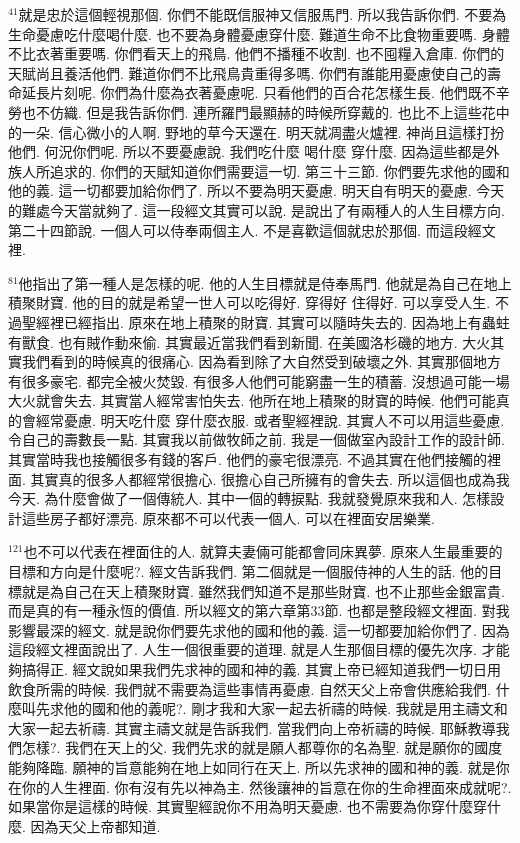 \documentclass{book}
\begin{document}
$^{41}$就是忠於這個輕視那個.
你們不能既信服神又信服馬門.
所以我告訴你們.
不要為生命憂慮吃什麼喝什麼.
也不要為身體憂慮穿什麼.
難道生命不比食物重要嗎.
身體不比衣著重要嗎.
你們看天上的飛鳥.
他們不播種不收割.
也不囤糧入倉庫.
你們的天賦尚且養活他們.
難道你們不比飛鳥貴重得多嗎.
你們有誰能用憂慮使自己的壽命延長片刻呢.
你們為什麼為衣著憂慮呢.
只看他們的百合花怎樣生長.
他們既不辛勞也不仿織.
但是我告訴你們.
連所羅門最顯赫的時候所穿戴的.
也比不上這些花中的一朵.
信心微小的人啊.
野地的草今天還在.
明天就凋盡火爐裡.
神尚且這樣打扮他們.
何況你們呢.
所以不要憂慮說.
我們吃什麼 喝什麼 穿什麼.
因為這些都是外族人所追求的.
你們的天賦知道你們需要這一切.
第三十三節.
你們要先求他的國和他的義.
這一切都要加給你們了.
所以不要為明天憂慮.
明天自有明天的憂慮.
今天的難處今天當就夠了.
這一段經文其實可以說.
是說出了有兩種人的人生目標方向.
第二十四節說.
一個人可以侍奉兩個主人.
不是喜歡這個就忠於那個.
而這段經文裡.

$^{81}$他指出了第一種人是怎樣的呢.
他的人生目標就是侍奉馬門.
他就是為自己在地上積聚財寶.
他的目的就是希望一世人可以吃得好.
穿得好 住得好.
可以享受人生.
不過聖經裡已經指出.
原來在地上積聚的財寶.
其實可以隨時失去的.
因為地上有蟲蛀 有獸食.
也有賊作動來偷.
其實最近當我們看到新聞.
在美國洛杉磯的地方.
大火其實我們看到的時候真的很痛心.
因為看到除了大自然受到破壞之外.
其實那個地方有很多豪宅.
都完全被火焚毀.
有很多人他們可能窮盡一生的積蓄.
沒想過可能一場大火就會失去.
其實當人經常害怕失去.
他所在地上積聚的財寶的時候.
他們可能真的會經常憂慮.
明天吃什麼 穿什麼衣服.
或者聖經裡說.
其實人不可以用這些憂慮.
令自己的壽數長一點.
其實我以前做牧師之前.
我是一個做室內設計工作的設計師.
其實當時我也接觸很多有錢的客戶.
他們的豪宅很漂亮.
不過其實在他們接觸的裡面.
其實真的很多人都經常很擔心.
很擔心自己所擁有的會失去.
所以這個也成為我今天.
為什麼會做了一個傳統人.
其中一個的轉捩點.
我就發覺原來我和人.
怎樣設計這些房子都好漂亮.
原來都不可以代表一個人.
可以在裡面安居樂業.

$^{121}$也不可以代表在裡面住的人.
就算夫妻倆可能都會同床異夢.
原來人生最重要的目標和方向是什麼呢?.
經文告訴我們.
第二個就是一個服侍神的人生的話.
他的目標就是為自己在天上積聚財寶.
雖然我們知道不是那些財寶.
也不止那些金銀富貴.
而是真的有一種永恆的價值.
所以經文的第六章第33節.
也都是整段經文裡面.
對我影響最深的經文.
就是說你們要先求他的國和他的義.
這一切都要加給你們了.
因為這段經文裡面說出了.
人生一個很重要的道理.
就是人生那個目標的優先次序.
才能夠搞得正.
經文說如果我們先求神的國和神的義.
其實上帝已經知道我們一切日用飲食所需的時候.
我們就不需要為這些事情再憂慮.
自然天父上帝會供應給我們.
什麼叫先求他的國和他的義呢?.
剛才我和大家一起去祈禱的時候.
我就是用主禱文和大家一起去祈禱.
其實主禱文就是告訴我們.
當我們向上帝祈禱的時候.
耶穌教導我們怎樣?.
我們在天上的父.
我們先求的就是願人都尊你的名為聖.
就是願你的國度能夠降臨.
願神的旨意能夠在地上如同行在天上.
所以先求神的國和神的義.
就是你在你的人生裡面.
你有沒有先以神為主.
然後讓神的旨意在你的生命裡面來成就呢?.
如果當你是這樣的時候.
其實聖經說你不用為明天憂慮.
也不需要為你穿什麼穿什麼.
因為天父上帝都知道.
\end{document}
